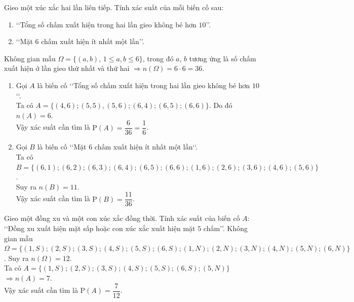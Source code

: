 \begin{ex}%
	Gieo một xúc xắc hai lần liên tiếp. Tính xác suất của mỗi biến cố sau:
	\begin{enumerate}
		\item \lq\lq Tổng số chấm xuất hiện trong hai lần gieo không bé hơn $10$\rq\rq.
		\item \lq\lq Mặt $6$ chấm xuất hiện ít nhất một lần\rq\rq.
	\end{enumerate}
	\loigiai
	{
		Không gian mẫu $\Omega= \{(a, b), \, 1\le a, b\le 6\}$, trong đó $a$, $b$ tương ứng là số chấm xuất hiện ở lần gieo thứ nhất và thứ hai $\Rightarrow n(\Omega)= 6\cdot 6=36$.
		\begin{enumerate}
			\item Gọi $A$ là biến cố \lq\lq Tổng số chấm xuất hiện trong hai lần gieo không bé hơn $10$\lq\lq.\\
			Ta có $A=\{(4,6); (5,5), (5,6); (6,4); (6,5); (6,6)\}$. Do đó $n(A)= 6$.\\
			Vậy xác suất cần tìm là $\mathrm{P}(A)= \dfrac{6}{36}= \dfrac{1}{6}$.
			\item Gọi $B$ là biến cố \lq\lq Mặt $6$ chấm xuất hiện ít nhất một lần\lq\lq.\\
			Ta có $B=\{(6,1); (6,2); (6,3); (6,4); (6,5); (6,6); (1,6); (2,6); (3,6); (4,6); (5,6)\}$.\\
			Suy ra $n(B)=11$.\\
			Vậy xác suất cần tìm là $\mathrm{P}(B)= \dfrac{11}{36}$.
		\end{enumerate}
	}
\end{ex}

\begin{ex}%
	Gieo một đồng xu và một con xúc xắc đồng thời. Tính xác suất của biến cố $A$: \lq\lq Đồng xu xuất hiện mặt sấp hoặc con xúc xắc xuất hiện mặt $5$ chấm\rq\rq.
	\loigiai
	{
		Không gian mẫu $\Omega= \{(1,S); (2,S); (3,S); (4,S); (5,S); (6,S); (1,N); (2,N); (3,N); (4,N); (5,N); (6,N)\}$. Suy ra $n(\Omega)= 12$.\\
		Ta có $A=\{(1,S); (2,S); (3,S); (4,S); (5,S); (6,S); (5,N)\}$ $\Rightarrow n(A)=7$.\\
		Vậy xác suất cần tìm là $\mathrm{P}(A)= \dfrac{7}{12}$.
	}
\end{ex}

